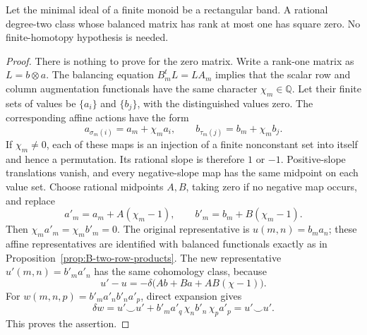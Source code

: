 \begin{lemma}
\label{B:rank-one-square}
Let the minimal ideal of a finite monoid be a rectangular band.
A rational degree-two class whose balanced matrix has rank at most one
has square zero.  No finite-homotopy hypothesis is needed.
\end{lemma}
\begin{proof}
There is nothing to prove for the zero matrix.  Write a rank-one
matrix as $L=b\otimes a$.  The balancing equation
$B_m^tL=LA_m$ implies that the scalar row and column augmentation
functionals have the same character $\chi_m\in\mathbb Q$.
Let their finite sets of values be $\{a_i\}$ and $\{b_j\}$,
with the distinguished values zero.  The corresponding affine actions
have the form
\[
 a_{\sigma_m(i)}=a_m+\chi_m a_i,\qquad
 b_{\tau_m(j)}=b_m+\chi_m b_j.
\]
If $\chi_m\ne0$, each of these maps is an injection of a finite
nonconstant set into itself and hence a permutation.  Its rational
slope is therefore $1$ or $-1$.  Positive-slope translations vanish,
and every negative-slope map has the same midpoint on each value set.
Choose rational midpoints $A,B$, taking zero if no negative map occurs,
and replace
\[
 a'_m=a_m+A(\chi_m-1),\qquad
 b'_m=b_m+B(\chi_m-1).
\]
Then $\chi_m a'_m=\chi_m b'_m=0$.  The original representative is
$u(m,n)=b_m a_n$; these affine representatives are identified with
balanced functionals exactly as in
Proposition~\ref{prop:B-two-row-products}.  The new representative
$u'(m,n)=b'_m a'_n$ has the same cohomology class, because
\[
 u'-u=-\delta\bigl(A b+B a+AB(\chi-1)\bigr).
\]
For $w(m,n,p)=b'_m a'_n b'_n a'_p$, direct expansion gives
\[
 \delta w=u'\smile u'
   +b'_m a'_q\,\chi_n b'_n\,\chi_p a'_p
 =u'\smile u'.
\]
This proves the assertion.
\end{proof}

